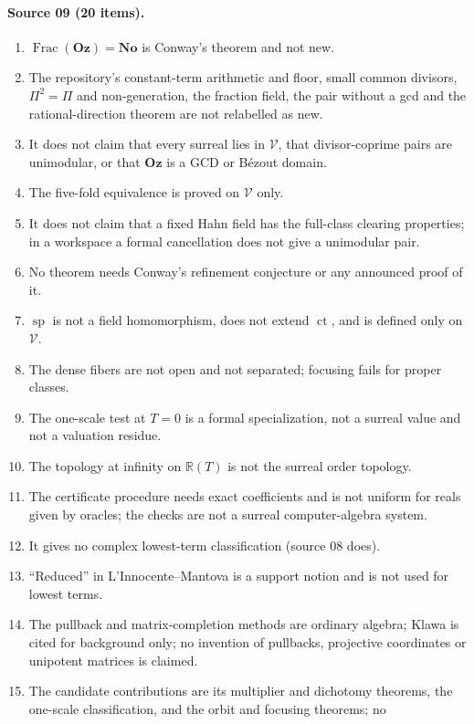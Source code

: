 \documentclass[11pt,oneside]{article}
\numberwithin{equation}{section}
\theoremstyle{definition}
\theoremstyle{remark}
\newcommand{\No}{\mathbf{No}}
\newcommand{\Oz}{\mathbf{Oz}}
\newcommand{\R}{\mathbb R}
\newcommand{\ct}{\operatorname{ct}}
\newcommand{\Frac}{\operatorname{Frac}}
\newcommand{\spz}{\operatorname{sp}}
\newcommand{\Vreg}{\mathcal V}
\begin{document}
\paragraph{Source 09 (20 items).}
\begin{enumerate}[leftmargin=*,itemsep=1pt]
\item $\Frac(\Oz)=\No$ is Conway's theorem and not new.
\item The repository's constant-term arithmetic and floor, small common
divisors, $\Pi^2=\Pi$ and non-generation, the fraction field, the pair without
a gcd and the rational-direction theorem are not relabelled as new.
\item It does not claim that every surreal lies in $\Vreg$, that
divisor-coprime pairs are unimodular, or that $\Oz$ is a GCD or B\'ezout
domain.
\item The five-fold equivalence is proved on $\Vreg$ only.
\item It does not claim that a fixed Hahn field has the full-class clearing
properties; in a workspace a formal cancellation does not give a unimodular
pair.
\item No theorem needs Conway's refinement conjecture or any announced proof
of it.
\item $\spz$ is not a field homomorphism, does not extend $\ct$, and is defined
only on $\Vreg$.
\item The dense fibers are not open and not separated; focusing fails for
proper classes.
\item The one-scale test at $T=0$ is a formal specialization, not a surreal
value and not a valuation residue.
\item The topology at infinity on $\R(T)$ is not the surreal order topology.
\item The certificate procedure needs exact coefficients and is not uniform
for reals given by oracles; the checks are not a surreal computer-algebra
system.
\item It gives no complex lowest-term classification (source 08 does).
\item ``Reduced'' in L'Innocente--Mantova is a support notion and is not used
for lowest terms.
\item The pullback and matrix-completion methods are ordinary algebra; Klawa is
cited for background only; no invention of pullbacks, projective coordinates or
unipotent matrices is claimed.
\item The candidate contributions are its multiplier and dichotomy theorems,
the one-scale classification, and the orbit and focusing theorems; no

\end{enumerate}
\end{document}
